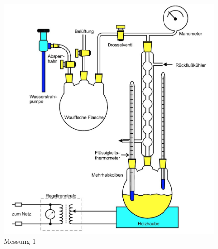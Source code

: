 \documentclass{scrartcl}
\begin{document}
\begin{figure}
  \centering
  \includegraphics[width=\textwidth]{bild3.png}
  \caption{Messung 1}
  \label{fig:plot1}
\end{figure}
\end{document}
